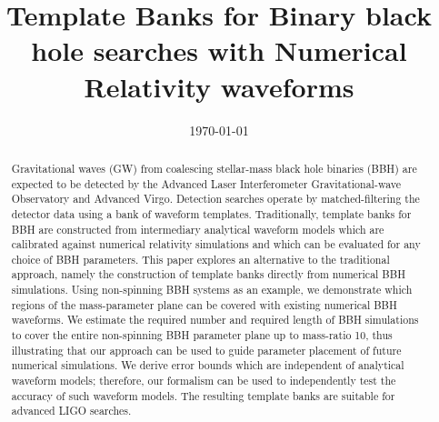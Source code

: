 \documentclass[aps,
prd,
twocolumn,
superscriptaddress,
lengthcheck,showpacs,letterpaper,nofootinbib,
floatfix]{revtex4-1}
\begin{document}
\date{\today}
\title{Template Banks for Binary black hole searches with Numerical Relativity waveforms}
\begin{abstract}
      Gravitational waves (GW) from coalescing stellar-mass black hole
	  binaries (BBH) are expected to be detected by the Advanced Laser
	  Interferometer Gravitational-wave Observatory and Advanced Virgo.
	  Detection searches operate by matched-filtering the detector data 
	  using a bank of waveform templates.
	  Traditionally, template banks for BBH are constructed from
	  intermediary analytical waveform models which are calibrated
	  against numerical relativity simulations and which can be
	  evaluated for any choice of BBH parameters.  This paper explores
	  an alternative to the traditional approach, namely the
	  construction of template banks directly from numerical BBH
	  simulations.  Using non-spinning BBH systems as an example, we
	  demonstrate which regions of the mass-parameter plane can be
	  covered with existing numerical BBH waveforms.  We estimate the
	  required number and required length of BBH simulations to cover
	  the entire non-spinning BBH parameter plane up to mass-ratio 10,
	  thus illustrating that our approach can be used to guide parameter placement of future numerical simulations.   We
	  derive error bounds which are independent of analytical waveform
	  models; therefore, our formalism can be used to independently test
	  the accuracy of such waveform models. The resulting template banks 
	  are suitable for advanced LIGO searches.


\end{abstract}
\end{document}
